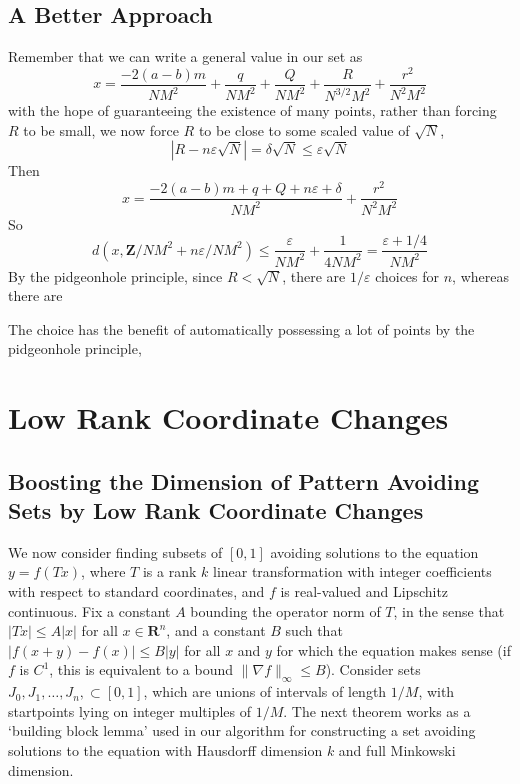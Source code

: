 \documentclass{report}
\theoremstyle{plain}
\theoremstyle{plain}
\begin{document}
\section{A Better Approach}

Remember that we can write a general value in our set as
%
\[ x = \frac{-2(a-b)m}{NM^2} + \frac{q}{NM^2} + \frac{Q}{NM^2} + \frac{R}{N^{3/2} M^2} + \frac{r^2}{N^2M^2} \]
%
with the hope of guaranteeing the existence of many points, rather than forcing $R$ to be small, we now force $R$ to be close to some scaled value of $\sqrt{N}$, 
%
\[ |R - n \varepsilon \sqrt{N}| = \delta \sqrt{N} \leq \varepsilon \sqrt{N} \]
%
Then
%
\[ x = \frac{-2(a-b)m + q + Q + n\varepsilon + \delta}{NM^2} + \frac{r^2}{N^2M^2} \]
%
So
%
\[ d \left( x, \mathbf{Z}/NM^2 + n\varepsilon / NM^2 \right) \leq \frac{\varepsilon}{NM^2} + \frac{1}{4NM^2} = \frac{\varepsilon + 1/4}{NM^2} \]
%
By the pidgeonhole principle, since $R < \sqrt{N}$, there are $1/\varepsilon$ choices for $n$, whereas there are


The choice has the benefit of automatically possessing a lot of points by the pidgeonhole principle,


\chapter{Low Rank Coordinate Changes}

\section{Boosting the Dimension of Pattern Avoiding Sets by Low Rank Coordinate Changes}

We now consider finding subsets of $[0,1]$ avoiding solutions to the equation $y = f(Tx)$, where $T$ is a rank $k$ linear transformation with integer coefficients with respect to standard coordinates, and $f$ is real-valued and Lipschitz continuous. Fix a constant $A$ bounding the operator norm of $T$, in the sense that $|Tx| \leq A|x|$ for all $x \in \mathbf{R}^n$, and a constant $B$ such that $|f(x+y) - f(x)| \leq B|y|$ for all $x$ and $y$ for which the equation makes sense (if $f$ is $C^1$, this is equivalent to a bound $\| \nabla f \|_\infty \leq B$). Consider sets $J_0, J_1, \dots, J_n, \subset [0,1]$, which are unions of intervals of length $1/M$, with startpoints lying on integer multiples of $1/M$. The next theorem works as a `building block lemma' used in our algorithm for constructing a set avoiding solutions to the equation with Hausdorff dimension $k$ and full Minkowski dimension.
\end{document}
